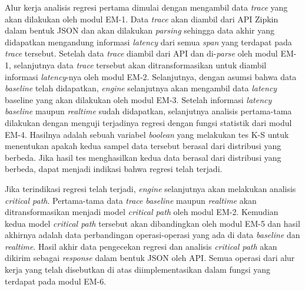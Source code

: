 Alur kerja analisis regresi pertama dimulai dengan mengambil data \textit{trace} yang akan dilakukan oleh modul EM-1. Data \textit{trace} akan diambil dari API Zipkin dalam bentuk JSON dan akan dilakukan \textit{parsing} sehingga data akhir yang didapatkan mengandung informasi \textit{latency} dari semua \textit{span} yang terdapat pada \textit{trace} tersebut. Setelah data \textit{trace} diambil dari API dan di-\textit{parse} oleh modul EM-1, selanjutnya data \textit{trace} tersebut akan ditransformasikan untuk diambil informasi \textit{latency}-nya oleh modul EM-2. Selanjutnya, dengan asumsi bahwa data \textit{baseline} telah didapatkan, \textit{engine} selanjutnya akan mengambil data \textit{latency} baseline yang akan dilakukan oleh modul EM-3. Setelah informasi \textit{latency} \textit{baseline} maupun \textit{realtime} sudah didapatkan, selanjutnya analisis pertama-tama dilakukan dengan menguji terjadinya regresi dengan fungsi statistik dari modul EM-4. Hasilnya adalah sebuah variabel \textit{boolean} yang melakukan tes K-S untuk menentukan apakah kedua sampel data tersebut berasal dari distribusi yang berbeda. Jika hasil tes menghasilkan kedua data berasal dari distribusi yang berbeda, dapat menjadi indikasi bahwa regresi telah terjadi. 

Jika terindikasi regresi telah terjadi, \textit{engine} selanjutnya akan melakukan analisis \textit{critical path}. Pertama-tama data \textit{trace} \textit{baseline} maupun \textit{realtime} akan ditransformasikan menjadi model \textit{critical path} oleh modul EM-2. Kemudian kedua model \textit{critical path} tersebut akan dibandingkan oleh modul EM-5 dan hasil akhirnya adalah data perbandingan operasi-operasi yang ada di data \textit{baseline} dan \textit{realtime}. Hasil akhir data pengecekan regresi dan analisis \textit{critical path} akan dikirim sebagai \textit{response} dalam bentuk JSON oleh API. Semua operasi dari alur kerja yang telah disebutkan di atas diimplementasikan dalam fungsi yang terdapat pada modul EM-6.

